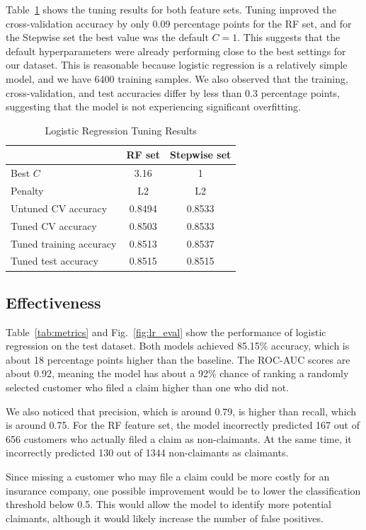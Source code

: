 \documentclass[conference]{IEEEtran}
\begin{document}
Table~\ref{tab:lr_tuning} shows the tuning results for both feature sets. Tuning improved the
cross-validation accuracy by only 0.09 percentage points for the RF set, and for the Stepwise set the best
value was the default $C = 1$. This suggests that the default hyperparameters were already performing close
to the best settings for our dataset. This is reasonable because logistic regression is a relatively simple
model, and we have \num{6400} training samples. We also observed that the training, cross-validation, and
test accuracies differ by less than 0.3 percentage points, suggesting that the model is not experiencing
significant overfitting.

\begin{table}[t]
\caption{Logistic Regression Tuning Results}
\label{tab:lr_tuning}
\centering
\begin{tabular}{@{}lcc@{}}
\toprule
 & \textbf{RF set} & \textbf{Stepwise set} \\
\midrule
Best $C$ & 3.16 & 1 \\
Penalty & L2 & L2 \\
Untuned CV accuracy & 0.8494 & 0.8533 \\
Tuned CV accuracy & 0.8503 & 0.8533 \\
Tuned training accuracy & 0.8513 & 0.8537 \\
Tuned test accuracy & 0.8515 & 0.8515 \\
\bottomrule
\end{tabular}
\end{table}

\subsection{Effectiveness}
Table~\ref{tab:metrics} and Fig.~\ref{fig:lr_eval} show the performance of logistic regression on the test
dataset. Both models achieved 85.15\% accuracy, which is about 18 percentage points higher than
the baseline. The ROC-AUC scores are about 0.92, meaning the model has about a 92\% chance of ranking
a randomly selected customer who filed a claim higher than one who did not.

We also noticed that precision, which is around 0.79, is higher than recall, which is around 0.75.
For the RF feature set, the model incorrectly predicted 167 out of 656 customers who actually filed a claim
as non-claimants. At the same time, it incorrectly predicted 130 out of \num{1344} non-claimants as claimants.

Since missing a customer who may file a claim could be more costly for an insurance company, one possible
improvement would be to lower the classification threshold below 0.5. This would allow the model to identify
more potential claimants, although it would likely increase the number of false positives.
\end{document}
